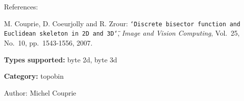 References:\par
 [CCZ07] M. Couprie, D. Coeurjolly and R. Zrour: {\tt \char`\"{}Discrete bisector function and Euclidean skeleton in 2D and 3D\char`\"{}}, {\em Image and Vision Computing\/}, Vol.~25, No.~10, pp.~1543-1556, 2007.\par


{\bf Types supported:} byte 2d, byte 3d

{\bf Category:} topobin

\begin{Desc}
\item[Author:]Michel Couprie \end{Desc}
